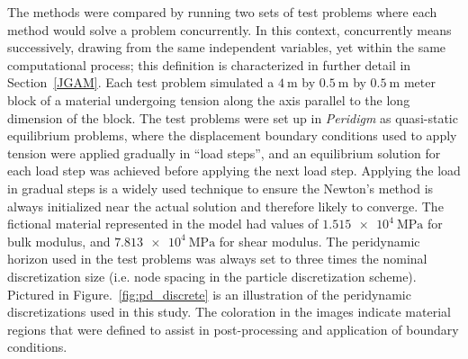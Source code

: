 \documentclass[preprint,12pt]{elsarticle}
\begin{document}
The methods were compared by running two sets of test problems where each method would solve a problem concurrently. In this context, concurrently means successively, drawing from the same independent variables, yet within the same computational process; this definition is characterized in further detail in Section~\ref{JGAM}. Each test problem simulated a $\SI{4}{\meter}$ by $\SI{0.5}{\meter}$ by $\SI{0.5}{\meter}$ meter block of a material undergoing tension along the axis parallel to the long dimension of the block. The test problems were set up in \emph{Peridigm} as quasi-static equilibrium problems, where the displacement boundary conditions used to apply tension were applied gradually in ``load steps'', and an equilibrium solution for each load step was achieved before applying the next load step. Applying the load in gradual steps is a widely used technique to ensure the Newton's method is always initialized near the actual solution and therefore likely to converge.  The fictional material represented in the model had values of $\SI{1.515e4}{\mega\pascal}$ for bulk modulus, and $\SI{7.813e4}{\mega\pascal}$ for shear modulus. The peridynamic horizon  used in the test problems was always set to three times the nominal discretization size (i.e.  node spacing in the particle discretization scheme). Pictured in Figure.~\ref{fig:pd_discrete} is an illustration of the peridynamic discretizations used in this study. The coloration in the images indicate material regions that were defined to assist in post-processing and application of boundary conditions. 
%
\end{document}
